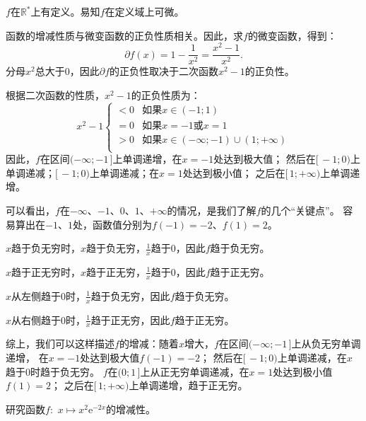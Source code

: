 \documentclass[12pt,UTF8]{ctexbook}
\begin{document}
\begin{so}
    $f$在$\mathbb{R}^*$上有定义。易知$f$在定义域上可微。

    函数的增减性质与微变函数的正负性质相关。因此，求$f$的微变函数，得到：
    $$ \partial f(x) = 1 - \frac{1}{x^2} = \frac{x^2 - 1}{x^2}.$$
    分母$ x^2 $总大于$0$，因此$ \partial f $的正负性取决于二次函数$x^2 - 1$的正负性。
    
    根据二次函数的性质，$x^2 - 1$的正负性质为：
    $$ x^2 - 1 \left\{
        \begin{array}{cl}
            < 0 & \mbox{如果}x \in (-1; 1) \\
            = 0 & \mbox{如果}x = -1 \mbox{或} x = 1 \\
            > 0 & \mbox{如果}x \in (-\infty; -1)\cup (1; +\infty)\\
        \end{array}\right.
    $$
    因此，$f$在区间$(-\infty; -1\,]$上单调递增，在$x = -1$处达到极大值；
    然后在$[\,-1; 0)$上单调递减；$[\,-1; 0)$上单调递减；在$x = 1$处达到极小值；
    之后在$[\,1; +\infty)$上单调递增。

    可以看出，$f$在$-\infty$、$-1$、$0$、$1$、$+\infty$的情况，是我们了解$f$的几个“关键点”。
    容易算出在$-1$、$1$处，函数值分别为$f(-1) = -2$、$f(1) = 2$。
    
    $x$趋于负无穷时，$x$趋于负无穷，$\frac{1}{x}$趋于$0$，因此$f$趋于负无穷。

    $x$趋于正无穷时，$x$趋于正无穷，$\frac{1}{x}$趋于$0$，因此$f$趋于正无穷。

    $x$从左侧趋于$0$时，$\frac{1}{x}$趋于负无穷，因此$f$趋于负无穷。
    
    $x$从右侧趋于$0$时，$\frac{1}{x}$趋于正无穷，因此$f$趋于正无穷。

    综上，我们可以这样描述$f$的增减：随着$x$增大，$f$在区间$(-\infty; -1\,]$上从负无穷单调递增，
    在$x = -1$处达到极大值$f(-1) = -2$；
    然后在$[\,-1; 0)$上单调递减，在$x$趋于$0$时趋于负无穷。
    $f$在$(0; 1\,]$上从正无穷单调递减，在$x = 1$处达到极小值$f(1) = 2$；
    之后在$[\,1; +\infty)$上单调递增，趋于正无穷。
\end{so}

\begin{et}
    研究函数$f:\,\,x\mapsto x^2 \mathrm{e}^{-2x}$的增减性。
\end{et}
\end{document}
